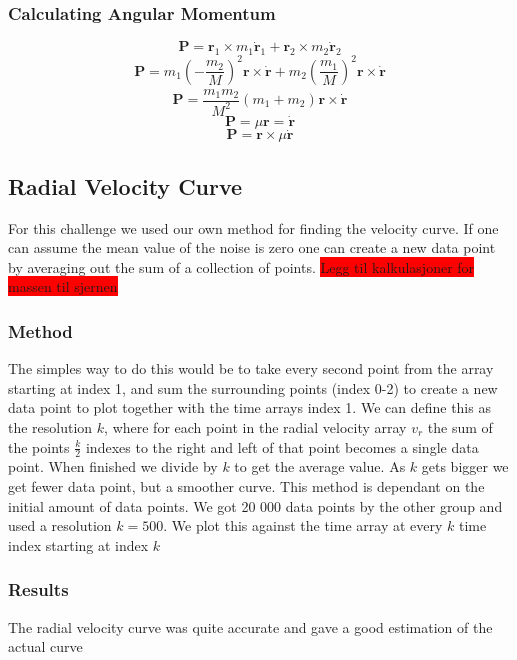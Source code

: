 \documentclass[reprint,english,notitlepage]{revtex4-2}
\begin{document}
		\subsubsection{Calculating Angular Momentum}\label{AM calc}
			\[
			\mathbf{P} = \mathbf{r}_1 \times m_1 \mathbf{\dot{r}}_1 + \mathbf{r}_2 × m_2 \mathbf{\dot{r}}_2
			\]
			\[
			\mathbf{P} = m_1 \left(- \frac{m_2}{M}\right)_{}^{2}\mathbf{r} × \mathbf{\dot{r}} + m_2 \left(\frac{m_1}{M}\right)_{}^{2} \mathbf{r} × \mathbf{\dot{r}}
			\]
			\[
			\mathbf{P} = \frac{m_1m_2}{M^{2}} \left(m_1 + m_2\right)_{}^{} \mathbf{r} × \mathbf{\dot{r}} 
			\]
			\[
			\mathbf{P} = \mu \mathbf{r} = \mathbf{\dot{r}}
			\]
			\[
			\mathbf{P} = \mathbf{r} \times \mu \mathbf{\dot{r}}
			\]
	\newpage
	\subsection{Radial Velocity Curve}
		For this challenge we used our own method for finding the velocity curve. If one can assume the mean value of the noise is zero one can create a new data point by averaging out the sum of a collection of points. 
		\colorbox{red}{Legg til kalkulasjoner for massen til sjernen}

		\subsubsection{Method}
			The simples way to do this would be to take every second point from the array starting at index 1, and sum the surrounding points (index 0-2) to create a new data point to plot together with the time arrays index 1. We can define this as the resolution $ k $, where for each point in the radial velocity array $ v_r $ the sum of the points $ \frac{k}{2} $ indexes to the right and left of that point becomes a single data point. When finished we divide by $ k $ to get the average value. As $ k $ gets bigger we get fewer data point, but a smoother curve. This method is dependant on the initial amount of data points. We got 20 000 data points by the other group and used a resolution $ k = 500 $. We plot this against the time array at every $ k $ time index starting at index $ k $

		\subsubsection{Results}	
			The radial velocity curve was quite accurate and gave a good estimation of the actual curve 
\end{document}
